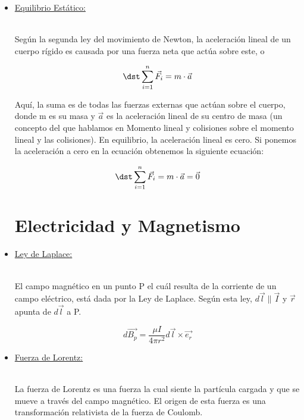 \documentclass[letterpaper,12pt]{article}
\begin{document}
\begin{itemize}
{\begin{itemize}
\end{itemize}

    }

    \item[\Plane]\large{\underline{Equilibrio Estático:}}\\\\
    \small{Según la segunda ley del movimiento de Newton, la aceleración lineal de un cuerpo rígido es causada por una fuerza neta que actúa sobre este, o

    $$\dst\sum^n_{i=1} \vec {F_i}= m \cdot
    \vec {a}$$

    Aquí, la suma es de todas las fuerzas externas que actúan sobre el cuerpo, donde m es su masa y  $\vec a$ es la aceleración lineal de su centro de masa (un concepto del que hablamos en Momento lineal y colisiones sobre el momento lineal y las colisiones). En equilibrio, la aceleración lineal es cero. Si ponemos la aceleración a cero en la ecuación obtenemos la siguiente ecuación: 


    $$\dst\sum^n_{i=1} \vec {F_i}= m \cdot
    \vec {a}=\vec {0}$$

    }
\pagestyle{fancy}

    \fancyhf{}
    \rfoot{\thepage}
    
\section{\Large{Electricidad y Magnetismo}}

    \item[\HandRight]\large{\underline{Ley de Laplace:}}\\\\
    \small{El campo magnético en un punto P el cuál resulta de la corriente de un campo eléctrico, está dada por la Ley de Laplace. Según esta ley, $d\vec{l}\parallel\vec{I}$ y $\vec{r}$ apunta de $d\vec{l}$ a P.


    $$d\vec{B_p}=\frac{\mu I}{4\pi r^2}d\vec{l}\times\vec{e_r}$$

    }

    \item[\HandRight]\large{\underline{Fuerza de Lorentz:}}\\\\
    \small{La fuerza de Lorentz es una fuerza la cual siente la partícula cargada y que se mueve a través del campo magnético. El origen de esta fuerza es una transformación relativista de la fuerza de Coulomb.

}
\end{itemize}
\end{document}
